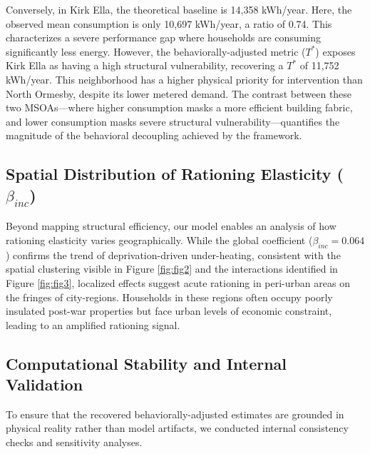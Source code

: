\documentclass[11pt, a4paper, twocolumn, numbers]{elsarticle}
\begin{document}
Conversely, in Kirk Ella, the theoretical baseline is 14,358 kWh/year. Here, the observed mean consumption is only 10,697 kWh/year, a ratio of 0.74. This characterizes a severe performance gap where households are consuming significantly less energy. However, the behaviorally-adjusted metric (\(T^*\)) exposes Kirk Ella as having a high structural vulnerability, recovering a \(T^*\) of 11,752 kWh/year. This neighborhood has a higher physical priority for intervention than North Ormesby, despite its lower metered demand. The contrast between these two MSOAs—where higher consumption masks a more efficient building fabric, and lower consumption masks severe structural vulnerability—quantifies the magnitude of the behavioral decoupling achieved by the framework.

\subsection{\texorpdfstring{Spatial Distribution of Rationing 
Elasticity
(\(\beta_{inc}\))}{Spatial Distribution of Rationing Elasticity 
(\textbackslash beta\_\{inc\})}}\label{spatial-distribution-of-rationing-elasticity-beta_inc}

Beyond mapping structural efficiency, our model enables an analysis of 
how rationing elasticity varies geographically. While the global 
coefficient (\(\beta_{inc} = 0.064\)) confirms the trend of 
deprivation-driven under-heating, consistent with the spatial clustering 
visible in Figure \ref{fig:fig2} and the interactions identified in Figure \ref{fig:fig3}, 
localized effects suggest acute rationing in peri-urban areas on the 
fringes of city-regions. 
 Households in these regions often occupy poorly insulated post-war 
properties but face urban levels of economic constraint, leading to an 
amplified rationing signal.

\subsection{Computational Stability and Internal Validation}\label{robustness-and-internal-validation}

To ensure that the recovered behaviorally-adjusted estimates are grounded in 
physical reality rather than model artifacts, we conducted internal 
consistency checks and sensitivity analyses.
\end{document}
